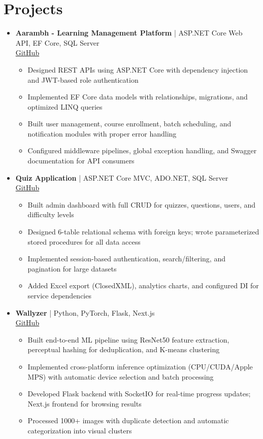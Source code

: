 \documentclass[11pt,a4paper]{article}
\newcommand{\resumeItem}[1]{
  \item\small{#1 \vspace{-1pt}}
}
\begin{document}
\section{Projects}
\begin{itemize}[leftmargin=*]

\item \textbf{Aarambh - Learning Management Platform} | ASP.NET Core Web API, EF Core, SQL Server \\
\href{https://github.com/Dhairya3391/Aarambh}{GitHub}
\begin{itemize}[leftmargin=*]
\resumeItem{Designed REST APIs using ASP.NET Core with dependency injection and JWT-based role authentication}
\resumeItem{Implemented EF Core data models with relationships, migrations, and optimized LINQ queries}
\resumeItem{Built user management, course enrollment, batch scheduling, and notification modules with proper error handling}
\resumeItem{Configured middleware pipelines, global exception handling, and Swagger documentation for API consumers}
\end{itemize}

\item \textbf{Quiz Application} | ASP.NET Core MVC, ADO.NET, SQL Server \\
\href{https://github.com/Dhairya3391/QuizApplication}{GitHub}
\begin{itemize}[leftmargin=*]
\resumeItem{Built admin dashboard with full CRUD for quizzes, questions, users, and difficulty levels}
\resumeItem{Designed 6-table relational schema with foreign keys; wrote parameterized stored procedures for all data access}
\resumeItem{Implemented session-based authentication, search/filtering, and pagination for large datasets}
\resumeItem{Added Excel export (ClosedXML), analytics charts, and configured DI for service dependencies}
\end{itemize}

\item \textbf{Wallyzer} | Python, PyTorch, Flask, Next.js \\
\href{https://github.com/Dhairya3391/wallyzer}{GitHub}
\begin{itemize}[leftmargin=*]
\resumeItem{Built end-to-end ML pipeline using ResNet50 feature extraction, perceptual hashing for deduplication, and K-means clustering}
\resumeItem{Implemented cross-platform inference optimization (CPU/CUDA/Apple MPS) with automatic device selection and batch processing}
\resumeItem{Developed Flask backend with SocketIO for real-time progress updates; Next.js frontend for browsing results}
\resumeItem{Processed 1000+ images with duplicate detection and automatic categorization into visual clusters}
\end{itemize}


\end{itemize}
\end{document}
